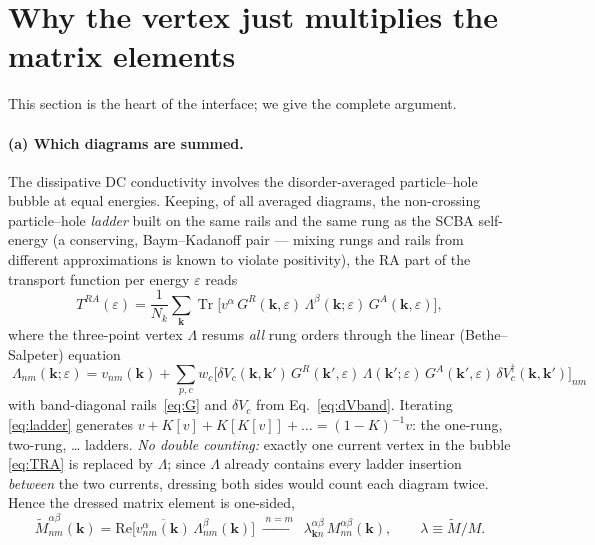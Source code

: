 \documentclass[11pt]{article}
\newcommand{\vk}{\mathbf{k}}
\newcommand{\eps}{\varepsilon}
\newcommand{\Tr}{\operatorname{Tr}}
\begin{document}
\section{Why the vertex just multiplies the matrix elements}
\label{sec:whylambda}
This section is the heart of the interface; we give the complete
argument.

\paragraph{(a) Which diagrams are summed.}
The dissipative DC conductivity involves the disorder-averaged
particle--hole bubble at equal energies.  Keeping, of all averaged
diagrams, the non-crossing particle--hole \emph{ladder} built on the
same rails and the same rung as the SCBA self-energy (a conserving,
Baym--Kadanoff pair --- mixing rungs and rails from different
approximations is known to violate positivity), the RA part of the
transport function per energy $\eps$ reads
\begin{equation}
T^{RA}(\eps)=\frac1{N_k}\sum_{\vk}\Tr\big[v^{\alpha}\,
G^{R}(\vk,\eps)\,\Lambda^{\beta}(\vk;\eps)\,G^{A}(\vk,\eps)\big],
\label{eq:TRA}
\end{equation}
where the three-point vertex $\Lambda$ resums \emph{all} rung orders
through the linear (Bethe--Salpeter) equation
\begin{equation}
\boxed{\;
\Lambda_{nm}(\vk;\eps)=v_{nm}(\vk)+\sum_{p,c}w_c\Big[
\delta V_c(\vk,\vk')\,G^{R}(\vk',\eps)\,\Lambda(\vk';\eps)\,
G^{A}(\vk',\eps)\,\delta V_c^{\dagger}(\vk,\vk')\Big]_{nm}\;}
\label{eq:ladder}
\end{equation}
with band-diagonal rails~\eqref{eq:G} and $\delta V_c$ from
Eq.~\eqref{eq:dVband}.  Iterating \eqref{eq:ladder} generates
$v+K[v]+K[K[v]]+\dots=(1-K)^{-1}v$: the one-rung, two-rung, \dots{}
ladders.  \emph{No double counting:} exactly one current vertex in the
bubble \eqref{eq:TRA} is replaced by $\Lambda$; since $\Lambda$ already
contains every ladder insertion \emph{between} the two currents,
dressing both sides would count each diagram twice.  Hence the dressed
matrix element is one-sided,
\begin{equation}
\tilde M^{\alpha\beta}_{nm}(\vk)
=\mathrm{Re}\big[\overline{v^{\alpha}_{nm}(\vk)}\,
\Lambda^{\beta}_{nm}(\vk)\big]
\;\xrightarrow{\;n=m\;}\;
\lambda^{\alpha\beta}_{\vk n}\,M^{\alpha\beta}_{nn}(\vk),
\qquad
\lambda\equiv\tilde M/M .
\label{eq:dressing}
\end{equation}
\end{document}
